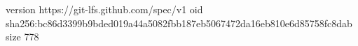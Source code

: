 version https://git-lfs.github.com/spec/v1
oid sha256:bc86d3399b9bded019a44a5082fbb187eb5067472da16eb810e6d85758fc8dab
size 778
